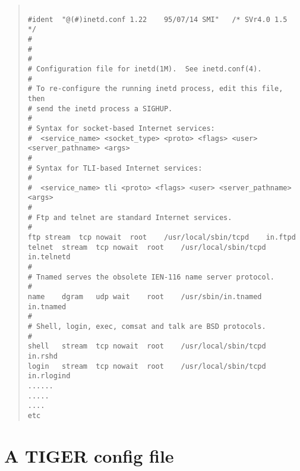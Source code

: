 \begin{quote}
\begin{verbatim}

#ident	"@(#)inetd.conf	1.22	95/07/14 SMI"	/* SVr4.0 1.5	*/
#
#
#
# Configuration file for inetd(1M).  See inetd.conf(4).
#
# To re-configure the running inetd process, edit this file, then
# send the inetd process a SIGHUP.
#
# Syntax for socket-based Internet services:
#  <service_name> <socket_type> <proto> <flags> <user> <server_pathname> <args>
#
# Syntax for TLI-based Internet services:
#
#  <service_name> tli <proto> <flags> <user> <server_pathname> <args>
#
# Ftp and telnet are standard Internet services.
#
ftp	stream	tcp	nowait	root	/usr/local/sbin/tcpd	in.ftpd
telnet	stream	tcp	nowait	root	/usr/local/sbin/tcpd	in.telnetd
#
# Tnamed serves the obsolete IEN-116 name server protocol.
#
name	dgram	udp	wait	root	/usr/sbin/in.tnamed	in.tnamed
#
# Shell, login, exec, comsat and talk are BSD protocols.
#
shell	stream	tcp	nowait	root	/usr/local/sbin/tcpd	in.rshd
login	stream	tcp	nowait	root	/usr/local/sbin/tcpd	in.rlogind
......
.....
....
etc

\end{verbatim}
\end{quote}

\newpage

\section{\label{a_tiger_config.file}A TIGER config file}

